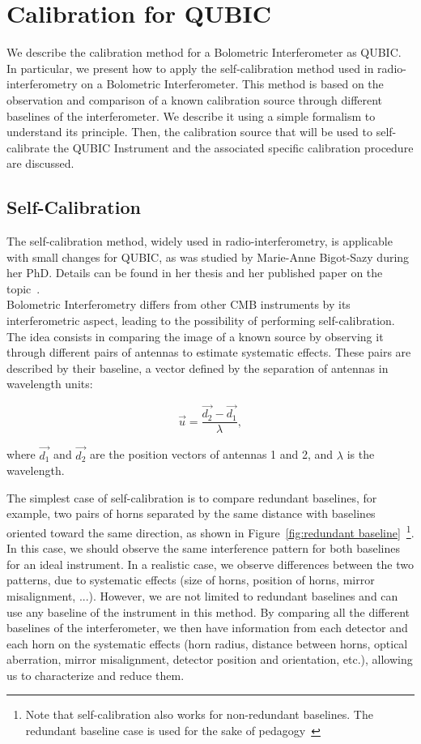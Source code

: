 \documentclass[../../thesis.tex]{subfiles}
\begin{document}
\section{Calibration for QUBIC}
We describe the calibration method for a Bolometric Interferometer as QUBIC. In particular, we present how to apply the self-calibration method used in radio-interferometry on a Bolometric Interferometer. This method is based on the observation and comparison of a known calibration source through different baselines of the interferometer. We describe it using a simple formalism to understand its principle. Then, the calibration source that will be used to self-calibrate the QUBIC Instrument and the associated specific calibration procedure are discussed.

\subsection{Self-Calibration}
The self-calibration method, widely used in radio-interferometry, is applicable with small changes for QUBIC, as was studied by Marie-Anne Bigot-Sazy during her PhD. Details can be found in her thesis\cite{thesismarie} and her published paper on the topic~\cite{paper_marie_selfcal}. \\
Bolometric Interferometry differs from other CMB instruments by its interferometric aspect, leading to the possibility of performing self-calibration. The idea consists in comparing the image of a known source by observing it through different pairs of antennas to estimate systematic effects. These pairs are described by their baseline, a vector defined by the separation of antennas in wavelength units:

\begin{equation}
    \vec{u} = \frac{\vec{d_2} - \vec{d_1}}{\lambda},
\end{equation}

where $\vec{d_1}$ and $\vec{d_2}$ are the position vectors of antennas 1 and 2, and $\lambda$ is the wavelength.

The simplest case of self-calibration is to compare redundant baselines, for example, two pairs of horns separated by the same distance with baselines oriented toward the same direction, as shown in Figure~\ref{fig:redundant baseline}~\footnote{Note that self-calibration also works for non-redundant baselines. The redundant baseline case is used for the sake of pedagogy~\cite{paper_marie_selfcal}}. In this case, we should observe the same interference pattern for both baselines for an ideal instrument. In a realistic case, we observe differences between the two patterns, due to systematic effects (size of horns, position of horns, mirror misalignment, ...). However, we are not limited to redundant baselines and can use any baseline of the instrument in this method\cite{paper_marie_selfcal}. By comparing all the different baselines of the interferometer, we then have information from each detector and each horn on the systematic effects (horn radius, distance between horns, optical aberration, mirror misalignment, detector position and orientation, etc.), allowing us to characterize and reduce them.
\end{document}
